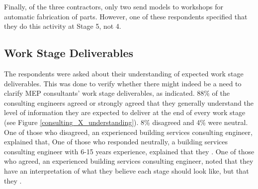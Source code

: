Finally, of the three contractors, only two send models to workshops for automatic fabrication of parts.
However, one of these respondents specified that they do this activity at Stage 5, not 4.

\subsection{Work Stage Deliverables}

The respondents were asked about their understanding of expected work stage deliverables.
This was done to verify whether there might indeed be a need to clarify MEP consultants' work stage deliverables, as \cite{Quigley2017} indicated.
88\% of the consulting engineers agreed or strongly agreed that they generally understand the level of information they are expected to deliver at the end of every work stage (see Figure \ref{consulting_X_understanding}).
8\% disagreed and 4\% were neutral.
One of those who disagreed, an experienced building services consulting engineer, explained that, 
One of those who responded neutrally, a building services consulting engineer with 6-15 years experience, explained that they .
One of those who agreed, an experienced building services consulting engineer, noted that they have an interpretation of what they believe each stage should look like, but that they .

